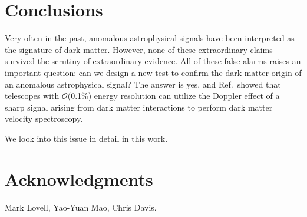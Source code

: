 \documentclass[aps,prd,10pt,twocolumn,superscriptaddress,showpacs]{revtex4-1}
\begin{document}
\section{Conclusions}
\label{sec:conclusions}

Very often in the past, anomalous astrophysical signals have been interpreted as the signature of dark matter.  However, none of these extraordinary claims survived the scrutiny of extraordinary evidence.  All of these false alarms raises an important question:  can we design a new test to confirm the dark matter origin of an anomalous astrophysical signal?  The answer is yes, and Ref.\,\cite{speckhard2016} showed that telescopes with $\mathcal{O}$(0.1\%) energy resolution can utilize the Doppler effect of a sharp signal arising from dark matter interactions to perform dark matter velocity spectroscopy.

We look into this issue in detail in this work.

 
\vspace{-0.5 cm}
	

\section*{Acknowledgments} 

Mark Lovell, Yao-Yuan Mao, Chris Davis.


\newcommand{\mnras}[0]{M.N.R.A.S.}
%
%	
	
\end{document}
